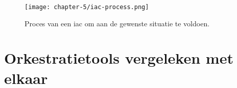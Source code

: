 \begin{figure}[hbt!]
  \centering
  \texttt{[image: chapter-5/iac-process.png]}
  \caption{Proces van een \acrfull{iac} om aan de gewenste situatie te voldoen.}
  \label{fig:ch5-iac-process}
\end{figure}

\section{Orkestratietools vergeleken met elkaar}\label{subsec:ch5-orkestratietools-vergeleken-met-elkaar}






